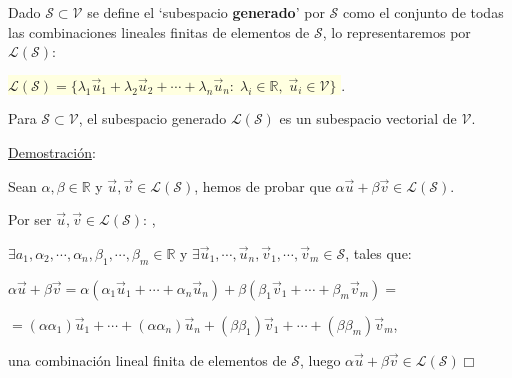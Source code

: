 \begin{definition}

Dado $\mathcal S \subset \mathcal V$ se define el `subespacio \textbf{generado}' por $\mathcal S$	como el conjunto de todas las combinaciones lineales finitas de elementos de $\mathcal S$, lo representaremos por $\mathcal{L(S)}$:

\vspace{2mm}
\centerline{\noindent \colorbox{LightYellow}{
	$\mathcal {L(S)}= \{\lambda_1 \vec u_1 + \lambda_2 \vec u_2 + \cdots +\lambda_n \vec u_n:\; \lambda_i \in \mathbb R, \; 
	 \vec u_i \in \mathcal V \}$
}\normalsize{.}}

\end{definition}


\begin{theorem}

Para $	\mathcal S \subset \mathcal V$, el subespacio generado  $\mathcal {L(S)}$ es un subespacio vectorial de $\mathcal V$.
\end{theorem}

\noindent \underline{Demostración}:

\noindent \textcolor{gris}{Sean $\alpha, \beta \in \mathbb R$ y $\vec u, \vec v \in \mathcal {L(S)}$, hemos de probar que $\alpha \vec u + \beta \vec v \in \mathcal {L(S)}$.}

\noindent \textcolor{gris}{Por ser $\vec u, \vec v  \in \mathcal {L(S)}$: ,}

\noindent \textcolor{gris}{$\exists a_1, \alpha_2, \cdots, \alpha_n, \beta_1, \cdots , \beta_m \in \mathbb R$ y 
$\exists \vec u_1, \cdots, \vec u_n, \vec v_1, \cdots , \vec v_m \in \mathcal S $, tales que:}

\noindent \textcolor{gris}{$\alpha \vec u + \beta \vec v = \alpha (\alpha_1 \vec u_1 + \cdots + \alpha_n \vec u_n) + \beta (\beta_1 \vec v_1+ \cdots + \beta_m \vec v_m)=$}

\noindent \textcolor{gris}{$= (\alpha \alpha_1) \vec u_1 + \cdots + (\alpha \alpha_n) \vec u_n + (\beta \beta_1) \vec v_1+ \cdots + (\beta \beta_m) \vec v_m $,} 

\noindent \textcolor{gris}{una combinación lineal finita de elementos de $\mathcal S$, luego $\alpha \vec u + \beta \vec v \in \mathcal {L(S)}$}\hspace{2cm}$\Box$



